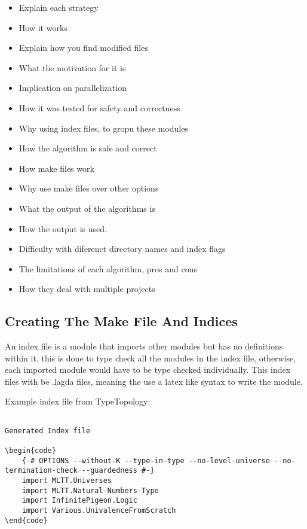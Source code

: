 \begin{itemize}
\item Explain each strategy 
\item How it works 
\item Explain how you find modified files
\item What the motivation for it is 
\item Implication on parallelization 
\item How it was tested for safety and correctness 
\item Why using index files, to gropu these modules 
\item How the algorithm is safe and correct 
\item How make files work 
\item Why use make files over other options 
\item What the output of the algorithms is 
\item How the output is used. 
\item Difficulty with diferenct directory names and index flags
\item The limitations of each algorithm, pros and cons 
\item How they deal with multiple projects
\end{itemize}

\subsection{Creating The Make File And Indices}

An index file is a module that imports other modules but has no definitions
within it, this is done to type check all the modules in the index file,
otherwise, each imported module would have to be type checked individually.
This index files with be .lagda files, meaning the use a latex like syntax to
write the module.

Example index file from TypeTopology:

\begin{lstlisting}
    
Generated Index file

\begin{code}
    {-# OPTIONS --without-K --type-in-type --no-level-universe --no-termination-check --guardedness #-}
    import MLTT.Universes
    import MLTT.Natural-Numbers-Type
    import InfinitePigeon.Logic
    import Various.UnivalenceFromScratch
\end{code}
\end{lstlisting}

